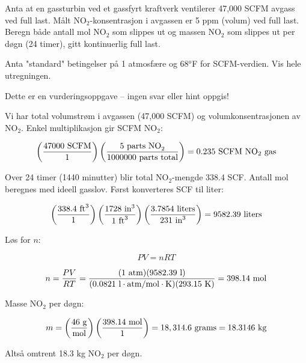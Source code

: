 

Anta at en gassturbin ved et gassfyrt kraftverk ventilerer 47,000 SCFM avgass ved full last. Målt NO$_{2}$-konsentrasjon i avgassen er 5 ppm (volum) ved full last. Beregn både antall mol NO$_{2}$ som slippes ut og massen NO$_{2}$ som slippes ut per døgn (24 timer), gitt kontinuerlig full last.

Anta "standard" betingelser på 1 atmosfære og 68$^{o}$F for SCFM-verdien. Vis hele utregningen.


\vfil

\eject






Dette er en vurderingsoppgave -- ingen svar eller hint oppgis!







Vi har total volumstrøm i avgassen (47,000 SCFM) og volumkonsentrasjonen av NO$_{2}$. Enkel multiplikasjon gir SCFM NO$_{2}$:

$$\left( {47000 \hbox{ SCFM} \over 1} \right) \left( {5 \hbox{ parts NO}_2 \over 1000000 \hbox{ parts total}} \right) = 0.235 \hbox{ SCFM NO}_2 \hbox{ gas}$$

Over 24 timer (1440 minutter) blir total NO$_{2}$-mengde 338.4 SCF. Antall mol beregnes med ideell gasslov. Først konverteres SCF til liter:

$$\left( {338.4 \hbox{ ft}^3 \over 1} \right) \left( {1728 \hbox{ in}^3 \over 1 \hbox{ ft}^3 } \right) \left( {3.7854 \hbox{ liters} \over 231 \hbox{ in}^3} \right) = 9582.39 \hbox{ liters}$$

Løs for $n$:

$$PV = nRT$$

$$n = {PV \over RT} = {(1 \hbox{ atm})(9582.39 \hbox{ l}) \over (0.0821 \hbox{ l}\cdot\hbox{atm/mol}\cdot\hbox{K})(293.15 \hbox{ K})} = 398.14 \hbox{ mol}$$

\vskip 10pt

Masse NO$_{2}$ per døgn:

$$m = \left(46 \hbox{ g} \over \hbox{mol} \right) \left({398.14 \hbox{ mol} \over 1} \right) = 18,314.6 \hbox{ grams} = 18.3146 \hbox{ kg}$$

Altså omtrent 18.3 kg NO$_{2}$ per døgn.


